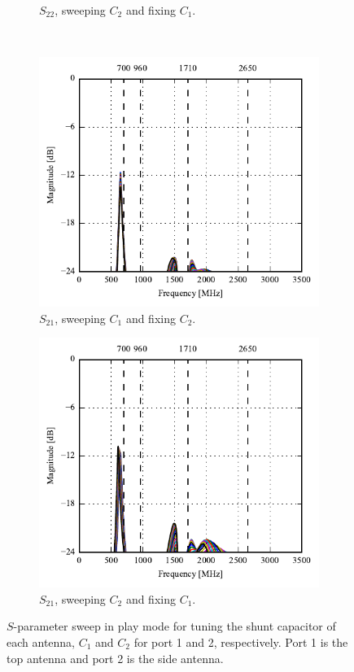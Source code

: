 \begin{figure}[htbp]
\begin{subfigure}[b]{0.49\linewidth}
        \caption{$S_{22}$, sweeping $C_2$ and fixing $C_1$.}
    \end{subfigure}
~
    \begin{subfigure}[b]{0.49\linewidth}
        \centering
        \includegraphics{img/tech_sol/monopole/play_mode/s21_s11}
        \caption{$S_{21}$, sweeping $C_1$ and fixing $C_2$.}
    \end{subfigure}
    \hfill
    \begin{subfigure}[b]{0.49\linewidth}
        \centering
        \includegraphics{img/tech_sol/monopole/play_mode/s21_s22}
        \caption{$S_{21}$, sweeping $C_2$ and fixing $C_1$.}
    \end{subfigure}
    \caption{$S$-parameter sweep in play mode for tuning the shunt capacitor of each antenna, $C_1$ and $C_2$ for port 1 and 2, respectively. Port 1 is the top antenna and port 2 is the side antenna.}
    \label{fig:sparam_mono_play_mode}
\end{figure}


